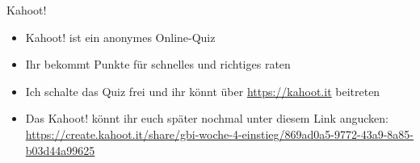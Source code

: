 \framePrevEpisode

\begin{frame}{Kahoot!}
	\begin{itemize}[<+->]
		\item Kahoot! ist ein anonymes Online-Quiz
		\item Ihr bekommt Punkte für schnelles und richtiges raten
		\item Ich schalte das Quiz frei und ihr könnt über \url{https://kahoot.it} beitreten
		\item Das Kahoot! könnt ihr euch später nochmal unter diesem Link angucken: \\
			\url{https://create.kahoot.it/share/gbi-woche-4-einstieg/869ad0a5-9772-43a9-8a85-b03d44a99625}
	\end{itemize}
\end{frame}


% 	


